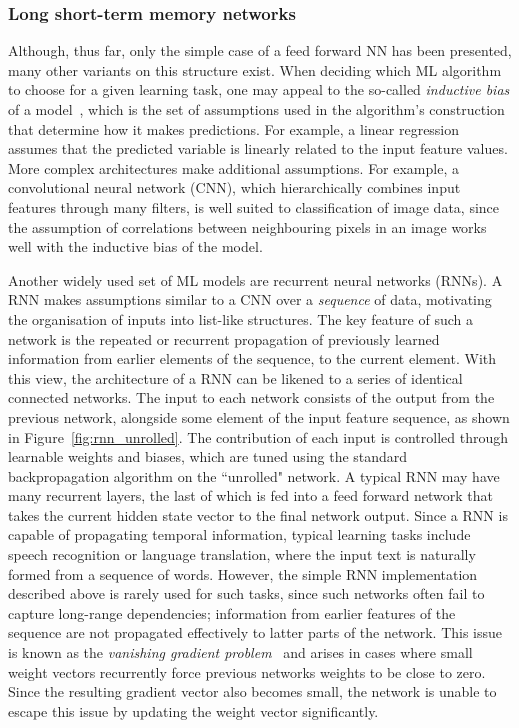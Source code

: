 \subsubsection{Long short-term memory networks}
\label{subsubsection:lstms}

Although, thus far, only the simple case of a feed forward NN has been presented, many other variants on this structure exist. When deciding which ML algorithm to choose for a given learning task, one may appeal to the so-called \emph{inductive bias} of a model~\cite{inductiveBias}, which is the set of assumptions used in the algorithm's construction that determine how it makes predictions. For example, a linear regression assumes that the predicted variable is linearly related to the input feature values. More complex architectures make additional assumptions. For example, a convolutional neural network (CNN), which hierarchically combines input features through many filters, is well suited to classification of image data, since the assumption of correlations between neighbouring pixels in an image works well with the inductive bias of the model. 

Another widely used set of ML models are recurrent neural networks (RNNs). A RNN makes assumptions similar to a CNN over a \textit{sequence} of data, motivating the organisation of inputs into list-like structures. The key feature of such a network is the repeated or recurrent propagation of previously learned information from earlier elements of the sequence, to the current element. With this view, the architecture of a RNN can be likened to a series of identical connected networks. The input to each network consists of the output from the previous network, alongside some element of the input feature sequence, as shown in Figure~\ref{fig:rnn_unrolled}. The contribution of each input is controlled through learnable weights and biases, which are tuned using the standard backpropagation algorithm on the ``unrolled" network. A typical RNN may have many recurrent layers, the last of which is fed into a feed forward network that takes the current hidden state vector to the final network output. Since a RNN is capable of propagating temporal information, typical learning tasks include speech recognition or language translation, where the input text is naturally formed from a sequence of words. However, the simple RNN implementation described above is rarely used for such tasks, since such networks often fail to capture long-range dependencies; information from earlier features of the sequence are not propagated effectively to latter parts of the network. This issue is known as the \textit{vanishing gradient problem}~\cite{vanishingGradient} and arises in cases where small weight vectors recurrently force previous networks weights to be close to zero. Since the resulting gradient vector also becomes small, the network is unable to escape this issue by updating the weight vector significantly.%

